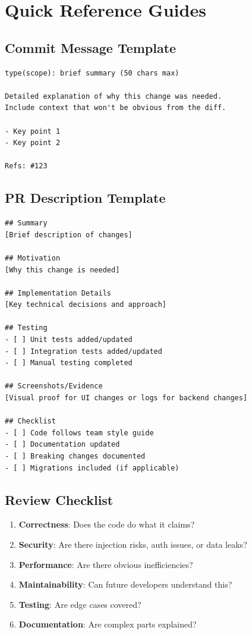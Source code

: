 \documentclass[11pt,openany]{book}
\begin{document}
\appendix

\chapter{Quick Reference Guides}

\section{Commit Message Template}
\begin{lstlisting}[style=shell]
type(scope): brief summary (50 chars max)

Detailed explanation of why this change was needed.
Include context that won't be obvious from the diff.

- Key point 1
- Key point 2

Refs: #123
\end{lstlisting}

\section{PR Description Template}
\begin{lstlisting}[style=markdown]
## Summary
[Brief description of changes]

## Motivation
[Why this change is needed]

## Implementation Details
[Key technical decisions and approach]

## Testing
- [ ] Unit tests added/updated
- [ ] Integration tests added/updated
- [ ] Manual testing completed

## Screenshots/Evidence
[Visual proof for UI changes or logs for backend changes]

## Checklist
- [ ] Code follows team style guide
- [ ] Documentation updated
- [ ] Breaking changes documented
- [ ] Migrations included (if applicable)
\end{lstlisting}

\section{Review Checklist}
\begin{enumerate}
  \item \textbf{Correctness}: Does the code do what it claims?
  \item \textbf{Security}: Are there injection risks, auth issues, or data leaks?
  \item \textbf{Performance}: Are there obvious inefficiencies?
  \item \textbf{Maintainability}: Can future developers understand this?
  \item \textbf{Testing}: Are edge cases covered?
  \item \textbf{Documentation}: Are complex parts explained?
\end{enumerate}
\end{document}

